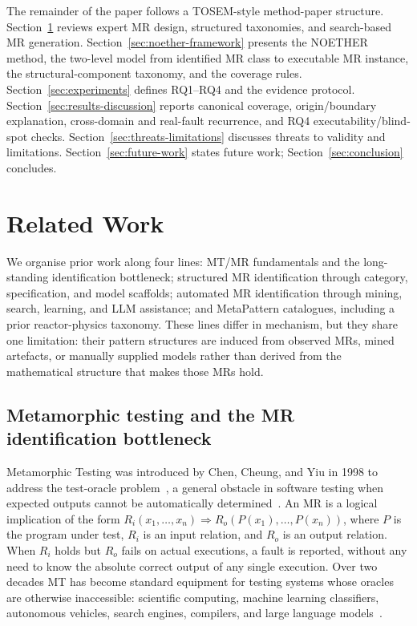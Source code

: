 \documentclass[acmsmall,screen,anonymous,review]{acmart}
\begin{document}
The remainder of the paper follows a TOSEM-style method-paper structure. Section~\ref{sec:related} reviews expert MR design, structured taxonomies, and search-based MR generation. Section~\ref{sec:noether-framework} presents the NOETHER method, the two-level model from identified MR class to executable MR instance, the structural-component taxonomy, and the coverage rules. Section~\ref{sec:experiments} defines RQ1--RQ4 and the evidence protocol. Section~\ref{sec:results-discussion} reports canonical coverage, origin/boundary explanation, cross-domain and real-fault recurrence, and RQ4 executability/blind-spot checks. Section~\ref{sec:threats-limitations} discusses threats to validity and limitations. Section~\ref{sec:future-work} states future work; Section~\ref{sec:conclusion} concludes.

\section{Related Work}
\label{sec:related}

We organise prior work along four lines: MT/MR fundamentals and the long-standing identification bottleneck; structured MR identification through category, specification, and model scaffolds; automated MR identification through mining, search, learning, and LLM assistance; and MetaPattern catalogues, including a prior reactor-physics taxonomy. These lines differ in mechanism, but they share one limitation: their pattern structures are induced from observed MRs, mined artefacts, or manually supplied models rather than derived from the mathematical structure that makes those MRs hold.

\subsection{Metamorphic testing and the MR identification bottleneck}

Metamorphic Testing was introduced by Chen, Cheung, and Yiu in 1998 to address the test-oracle problem~\cite{Chen1998}, a general obstacle in software testing when expected outputs cannot be automatically determined~\cite{Barr2015OracleProblem}. An MR is a logical implication of the form $R_i(x_1,\dots,x_n) \Rightarrow R_o(P(x_1),\dots,P(x_n))$, where $P$ is the program under test, $R_i$ is an input relation, and $R_o$ is an output relation. When $R_i$ holds but $R_o$ fails on actual executions, a fault is reported, without any need to know the absolute correct output of any single execution. Over two decades MT has become standard equipment for testing systems whose oracles are otherwise inaccessible: scientific computing, machine learning classifiers, autonomous vehicles, search engines, compilers, and large language models~\cite{Segura2016, LiTOSEM2025}.
\end{document}
